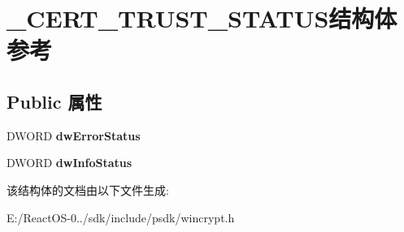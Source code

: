 \hypertarget{struct___c_e_r_t___t_r_u_s_t___s_t_a_t_u_s}{}\section{\+\_\+\+C\+E\+R\+T\+\_\+\+T\+R\+U\+S\+T\+\_\+\+S\+T\+A\+T\+U\+S结构体 参考}
\label{struct___c_e_r_t___t_r_u_s_t___s_t_a_t_u_s}
\subsection*{Public 属性}
\begin{DoxyCompactItemize}
\item 
\mbox{\label{struct___c_e_r_t___t_r_u_s_t___s_t_a_t_u_s_a47cb25f8e98f3cc64ded9b37e6c8f384}} 
D\+W\+O\+RD {\bfseries dw\+Error\+Status}
\item 
\mbox{\label{struct___c_e_r_t___t_r_u_s_t___s_t_a_t_u_s_ad9b2407f088dae08d27199f9d1115135}} 
D\+W\+O\+RD {\bfseries dw\+Info\+Status}
\end{DoxyCompactItemize}


该结构体的文档由以下文件生成\+:\begin{DoxyCompactItemize}
\item 
E\+:/\+React\+O\+S-\/0../sdk/include/psdk/wincrypt.\+h\end{DoxyCompactItemize}
